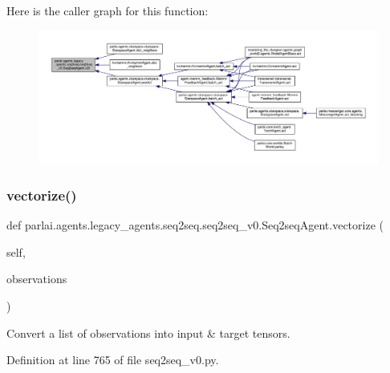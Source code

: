 Here is the caller graph for this function\+:
\nopagebreak
\begin{figure}[H]
\begin{center}
\leavevmode
\includegraphics[width=350pt]{classparlai_1_1agents_1_1legacy__agents_1_1seq2seq_1_1seq2seq__v0_1_1Seq2seqAgent_a8f6de929b475d3915c159c48165b4575_icgraph}
\end{center}
\end{figure}
\mbox{\label{classparlai_1_1agents_1_1legacy__agents_1_1seq2seq_1_1seq2seq__v0_1_1Seq2seqAgent_a83e2433e00bff6162ebad3b818771b59}} 
\subsubsection{\texorpdfstring{vectorize()}{vectorize()}}
{\footnotesize\ttfamily def parlai.\+agents.\+legacy\+\_\+agents.\+seq2seq.\+seq2seq\+\_\+v0.\+Seq2seq\+Agent.\+vectorize (\begin{DoxyParamCaption}\item[{}]{self,  }\item[{}]{observations }\end{DoxyParamCaption})}

\begin{DoxyVerb}Convert a list of observations into input & target tensors.\end{DoxyVerb}
 

Definition at line 765 of file seq2seq\+\_\+v0.\+py.



